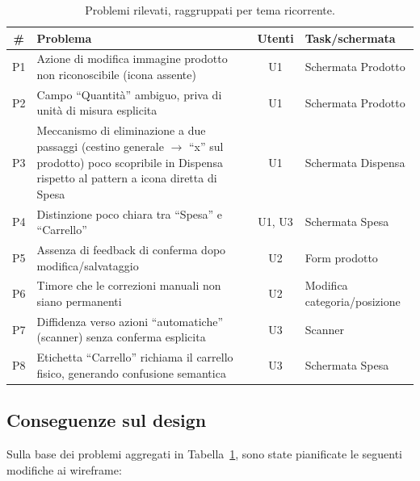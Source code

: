 \documentclass[11pt,a4paper]{article}
\begin{document}
\begin{table}[H]
\centering
\small
\renewcommand{\arraystretch}{1.3}
\begin{tabularx}{\textwidth}{c >{\raggedright\arraybackslash}p{5.5cm} c >{\raggedright\arraybackslash}X}
\toprule
\textbf{\#} & \textbf{Problema} & \textbf{Utenti} & \textbf{Task/schermata} \\
\midrule
P1 & Azione di modifica immagine prodotto non riconoscibile (icona assente) & U1 & Schermata Prodotto \\ \addlinespace[0.3em]
P2 & Campo ``Quantità'' ambiguo, priva di unità di misura esplicita & U1 & Schermata Prodotto \\ \addlinespace[0.3em]
P3 & Meccanismo di eliminazione a due passaggi (cestino generale $\rightarrow$ ``x'' sul prodotto) poco scopribile in Dispensa rispetto al pattern a icona diretta di Spesa & U1 & Schermata Dispensa \\ \addlinespace[0.3em]
P4 & Distinzione poco chiara tra ``Spesa'' e ``Carrello'' & U1, U3 & Schermata Spesa \\ \addlinespace[0.3em]
P5 & Assenza di feedback di conferma dopo modifica/salvataggio & U2 & Form prodotto \\ \addlinespace[0.3em]
P6 & Timore che le correzioni manuali non siano permanenti & U2 & Modifica categoria/posizione \\ \addlinespace[0.3em]
P7 & Diffidenza verso azioni ``automatiche'' (scanner) senza conferma esplicita & U3 & Scanner \\ \addlinespace[0.3em]
P8 & Etichetta ``Carrello'' richiama il carrello fisico, generando confusione semantica & U3 & Schermata Spesa \\
\bottomrule
\end{tabularx}
\caption{Problemi rilevati, raggruppati per tema ricorrente.}
\label{tab:eval_issues}
\end{table}

\subsection{Conseguenze sul design}
\label{subsec:eval_conseguenze}
Sulla base dei problemi aggregati in Tabella~\ref{tab:eval_issues}, sono state pianificate le seguenti modifiche ai wireframe:
\end{document}
